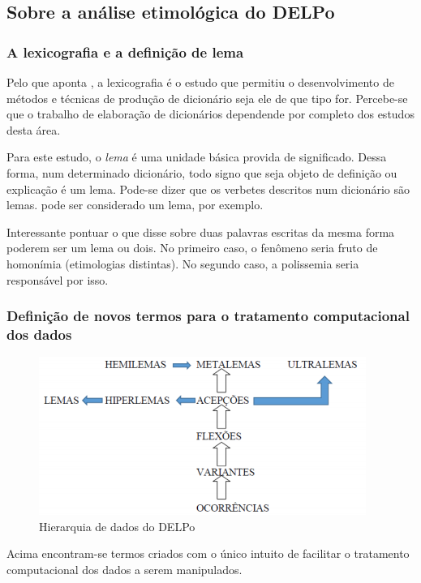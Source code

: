 \subsection{Sobre a análise etimológica do DELPo}
\label{subsec:analise-etimologica}

\subsubsection{A lexicografia e a definição de lema}
\label{subsubsec:lexicografia-lema}

Pelo que aponta \citet[p.~20]{Bar:14}, a lexicografia é o estudo que permitiu o
desenvolvimento de métodos e técnicas de produção de dicionário seja ele de que
tipo for. Percebe-se que o trabalho de elaboração de dicionários dependende por
completo dos estudos desta área.

Para este estudo, o \emph{lema} é uma unidade básica provida de significado.
Dessa forma, num determinado dicionário, todo signo que seja objeto de definição
ou explicação é um lema. Pode-se dizer que os verbetes descritos num dicionário
são lemas.  pode ser considerado um lema, por exemplo.

Interessante pontuar o que disse \citet[p.~146]{Mar:17} sobre duas palavras escritas
da mesma forma poderem ser um lema ou dois. No primeiro caso, o fenômeno seria
fruto de homonímia (etimologias distintas). No segundo caso, a polissemia seria
responsável por isso.

\subsubsection{Definição de novos termos para o tratamento computacional dos
dados}\label{subsubsec:tratamento-computacional-dos-dados}

\begin{figure}[ht]
    \centering
    \includegraphics[width=.5\textwidth]{figuras/dado_hierarquia_delpo.png}
    \caption{Hierarquia de dados do DELPo}
    \label{fig:dados-hierarquia}
\end{figure}

Acima encontram-se termos criados com o único intuito de facilitar o tratamento
computacional dos dados a serem manipulados.


